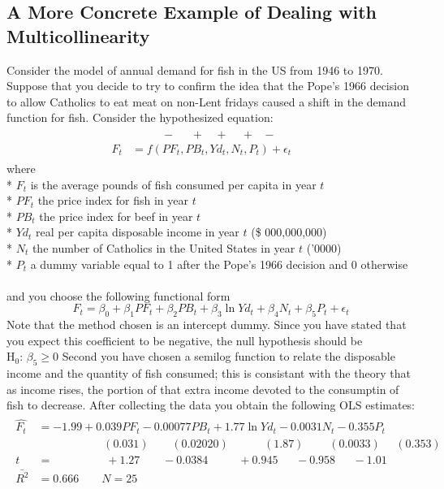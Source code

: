 \documentclass[11pt]{article}
\begin{document}
\subsection{A More Concrete Example of Dealing with Multicollinearity}
Consider the model of annual demand for fish in the US from 1946 to 1970. Suppose that you decide to try to confirm the idea that the Pope's 1966 decision to allow Catholics to eat meat on non-Lent fridays caused a shift in the demand function for fish. Consider the hypothesized equation:
\begin{align}
\label{eg8_22}
\begin{split}
& \>\>\>\>\>\>\>\>\>\>\>\>-\>\>\>\>\>\>+\>\>\>\>+\>\>\>\>\>+\>\>\>-\quad\quad\quad\\
F_t &= f(PF_t, PB_t, Yd_t, N_t, P_t) + \epsilon_t
\end{split}
\end{align}
where\\*
$F_t$ is the average pounds of fish consumed per capita in year $t$\\*
$PF_t$ the price index for fish in year $t$\\*
$PB_t$ the price index for beef in year $t$\\*
$Yd_t$ real per capita disposable income in year $t$ (\$ 000,000,000)\\*
$N_t$ the number of Catholics in the United States in year $t$ ('0000)\\*
$P_t$ a dummy variable equal to 1 after the Pope's 1966 decision and 0 otherwise\\\\
and you choose the following functional form
\begin{equation}
F_t = \beta_0 + \beta_1PF_t + \beta_2PB_t + \beta_3\ln Yd_t + \beta_4N_t + \beta_5P_t + \epsilon_t \label{eg8_23}
\end{equation}
Note that the method chosen is an intercept dummy. Since you have stated that you expect this coefficient to be negative, the null hypothesis should be $\text{H}_0\text{: } \beta_5 \geq 0$ Second you have chosen a semilog function to relate the disposable income and the quantity of fish consumed; this is consistant with the theory that as income rises, the portion of that extra income devoted to the consumptin of fish to decrease. After collecting the data you obtain the following OLS estimates:
\begin{align}
\label{eg8_24}
\begin{split}
\hat{F_t} &= -1.99 + 0.039PF_t - 0.00077PB_t + 1.77\ln Yd_t - 0.0031N_t - 0.355P_t\\
&\>\>\>\>\>\>\>\>\>\>\>\>\>\>\>\>\>\>\>\>\>\>\>\>\>\> (0.031) 
\>\>\>\>\>\>\>\>\> (0.02020)
\>\>\>\>\>\>\>\>\>\>\>\>\>\> (1.87)
\>\>\>\>\>\>\>\>\>\> (0.0033)
\>\>\>\>\>\> (0.353)\\
t&=\>\>\>\>\>\>\>\>\>\>\>\>\>\>\>\>\>\>\>\>\> +1.27 
\>\>\>\>\>\>\>\>\> -0.0384
\>\>\>\>\>\>\>\>\>\>\>\> +0.945
\>\>\>\>\>\>\> -0.958
\>\>\>\>\>\>\> -1.01\\
\bar{R^2}&= 0.666 \quad\quad N=25
\end{split}
\end{align}
\end{document}
